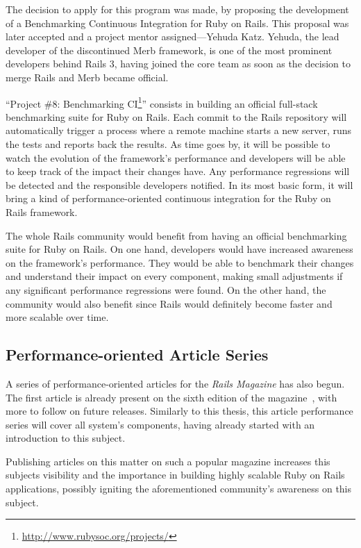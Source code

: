 The decision to apply for this program was made, by proposing the development of a Benchmarking Continuous Integration for Ruby on Rails. This proposal was later accepted and a project mentor assigned---Yehuda Katz. Yehuda, the lead developer of the discontinued Merb framework, is one of the most prominent developers behind Rails 3, having joined the core team as soon as the decision to merge Rails and Merb became official.

``Project \#8: Benchmarking CI\footnote{\url{http://www.rubysoc.org/projects/}}'' consists in building an official full-stack benchmarking suite for Ruby on Rails. Each commit to the Rails repository will automatically trigger a process where a remote machine starts a new server, runs the tests and reports back the results. As time goes by, it will be possible to watch the evolution of the framework's performance and developers will be able to keep track of the impact their changes have. Any performance regressions will be detected and the responsible developers notified. In its most basic form, it will bring a kind of performance-oriented continuous integration for the Ruby on Rails framework.

The whole Rails community would benefit from having an official benchmarking suite for Ruby on Rails. On one hand, developers would have increased awareness on the framework's performance. They would be able to benchmark their changes and understand their impact on every component, making small adjustments if any significant performance regressions were found. On the other hand, the community would also benefit since Rails would definitely become faster and more scalable over time.


\subsection{Performance-oriented Article Series}
A series of performance-oriented articles for the \textit{Rails Magazine} has also begun. The first article is already present on the sixth edition of the magazine~\cite{rails_magazine_6}, with more to follow on future releases. Similarly to this thesis, this article performance series will cover all system's components, having already started with an introduction to this subject.

Publishing articles on this matter on such a popular magazine increases this subjects visibility and the importance in building highly scalable Ruby on Rails applications, possibly igniting the aforementioned community's awareness on this subject.
